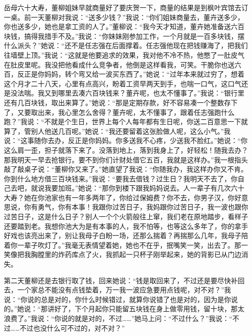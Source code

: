 \documentclass[12pt,oneside]{book}
\begin{document}
岳母六十大寿，董柳姐妹早就商量好了要庆贺一下，商量的结果是到枫叶宾馆去订一桌。前一天董柳对我说：``送多少钱？''我说：``你们姐妹商量去，董卉送多少，你也送多少，她也是拿工资的人了。''董柳说：``我今天才知道，董卉她准备送六百块钱，搞得我措手不及。''我说：``你妹妹刚参加工作，一个月就是一百多块钱，摆什么派头？''她说：``还不是任志强在后面撑着。任志强他现在把钱赚海了，把我们往墙壁上顶。''我说：``这就是他要追求的效果，我对他不冷不热，他憋了一肚皮气在肚皮里呢。我没把他看成什么竞争者，他倒是这样看我，可笑。干脆你也送六百，反正是你妈妈，转个弯又给一波买东西了。''她说：``过年本来就过穷了，想着这个月才二十八天，心里有点高兴，盼着工资早两天到手，也喘一口气，这口气还是没法喘。我又到哪里去凑六百块钱来？董卉呢，也太不懂事了。''我说：``银行里还有几百块钱，取出来算了。''她说：``那是定期存款，好不容易凑一个整数存下了，又要取出来，我心里怎么舍得？董卉呢，太不懂事了，跟着任志强跑什么跑？''我说：``不就是个生日，世界上每个人每年都有生日呢，你送二百意思一下就算了，管别人他送几百呢。''她说：``我还要留着这张脸做人呢，这么小气。''我说：``这事随你去办，反正是你妈妈。你多送我不心疼，少送我不脸红。''她说：``你这么肩一歪，担子就落下来了。没落到地上，落到我身上了，好轻松！随我去办？那我明天一早去抢银行。要不到你们计财处借它五百，我就是这样办。''我一根指头敲了敲桌子说：``董柳你又来了。''她直望了我说：``你随我办，我这样办你又不肯。你到什么地方借三百块钱来。''我说：``要我去借钱？过生日？我明天不去了，你自己去吧，就说我要加班。''她说：``那你到楼下跟我妈妈说去。人一辈子有几次六十大寿？她在你池家也有一年多两年了，你给过保姆费？你不去，你男子汉，你好意思说，你有勇气，你有本事！我跟你过苦日子，我妈跟你过苦日子，我一波也跟你过苦日子，这是什么日子？别人一个个火箭般往上窜，我们老在原地踏步，看样子还要踏到老。我想你池大为是有本事的人，我不怕等，也等这么多年了，你的拿手好戏也该亮出来了，别让我母子白盼一场，还那么揣着？再揣那么几年，我母子陪着你一辈子吹灯了。''我毫无表情望着她，她也不在乎，抿嘴笑一笑，出去了。那一笑像把我胸膛里的炸药库点了火，我抓起一只杯子刚举起来，她的背影已从门边消失。

第二天董柳还是去银行取了钱，回来她说：``钱是取回来了，不过还是要尽快补回去，一个家总不能没有点钱垫着，万一我一波应急要用点钱呢，对不对？''我说：``你说的总是对的，你什么时候错过，就算你说错了也是对的，因为是你说的。''她说：``那讲好了，下个月起你只能留五块钱在身上做零用钱，留十块，那太浪费了。''我说：``你说的就是对的，不过\ldots\ldots{}''她马上问：``不过什么？''我说：``不过\ldots\ldots 不过也没什么可不过的，对不对？''
\end{document}
